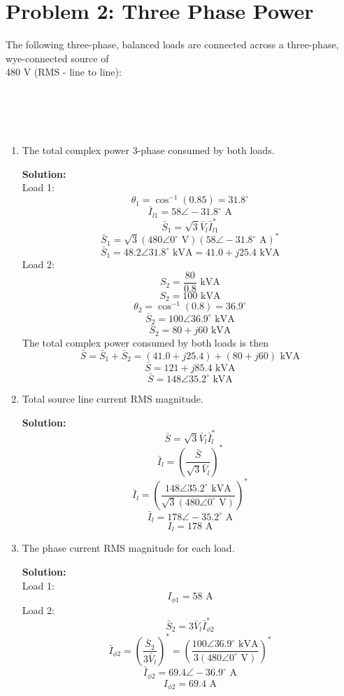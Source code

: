 \documentclass{article}
\begin{document}
\section*{Problem 2: Three Phase Power}
The following three-phase, balanced loads are connected across a three-phase, wye-connected source of \\ 480 V (RMS - line to line):   \\ \\ 
 \\
\\ \\ 
\begin{enumerate}[label=(\alph*)]
    \item {The total complex power 3-phase consumed by both loads. }

\textbf{Solution:}\\
Load 1:
$$\theta_1 = \cos^{-1}(0.85) = 31.8^{\circ}$$
$$\bar{I}_{l1} = 58\angle -31.8^{\circ} \text{ A}$$
$$\bar{S}_1 = \sqrt{3}\bar{V}_l\bar{I}_{l1}^{\ast}$$
$$\bar{S}_1 = \sqrt{3}(480\angle 0^{\circ} \text{ V})(58\angle -31.8^{\circ} \text{ A})^{\ast}$$
$$\bar{S}_1 = 48.2 \angle 31.8^{\circ} \text{ kVA} = 41.0 + j25.4 \text{ kVA}$$
Load 2:
$$S_2 = \frac{80}{0.8} \text{ kVA}$$
$$S_2 = 100\text{ kVA}$$
$$\theta_2 = \cos^{-1}(0.8) = 36.9^{\circ}$$
$$\bar{S}_2 = 100\angle 36.9^{\circ} \text{ kVA}$$
$$\bar{S}_2 = 80 + j60\text{ kVA}$$
The total complex power consumed by both loads is then
$$\bar{S} = \bar{S}_1 + \bar{S}_2 = (41.0 + j25.4) + (80 + j60) \text{ kVA}$$
$$\bar{S} = 121 + j85.4 \text{ kVA}$$
$$\boxed{\bar{S} = 148\angle 35.2^{\circ} \text{ kVA}}$$

    \item {Total source line current RMS magnitude.}

\textbf{Solution:}
$$\bar{S} = \sqrt{3}\bar{V}_l\bar{I}_{l}^{\ast}$$
$$\bar{I}_l = \left(\frac{\bar{S}}{\sqrt{3}\bar{V}_l}\right)^{\ast}$$
$$\bar{I}_l = \left(\frac{148\angle 35.2^{\circ} \text{ kVA}}{\sqrt{3}(480\angle 0^{\circ} \text{ V})}\right)^{\ast}$$
$$\bar{I}_l = 178\angle -35.2^{\circ} \text{ A}$$
$$\boxed{I_l = 178 \text{ A}}$$


    \item {The phase current RMS magnitude for each load.}

\textbf{Solution:} \\
Load 1:
$$\boxed{I_{\phi 1} = 58 \text{ A}}$$
Load 2:
$$\bar{S}_2 = 3\bar{V}_l\bar{I}_{\phi 2}^{\ast}$$
$$\bar{I}_{\phi 2} = \left(\frac{\bar{S}_2}{3\bar{V}_l}\right)^{\ast} = \left(\frac{100\angle 36.9^{\circ} \text{ kVA}}{3(480\angle 0^{\circ} \text{ V})}\right)^{\ast}$$
$$\bar{I}_{\phi 2} = 69.4\angle -36.9^{\circ} \text{ A}$$
$$\boxed{I_{\phi 2} = 69.4\text{ A}}$$


\end{enumerate}
\end{document}
